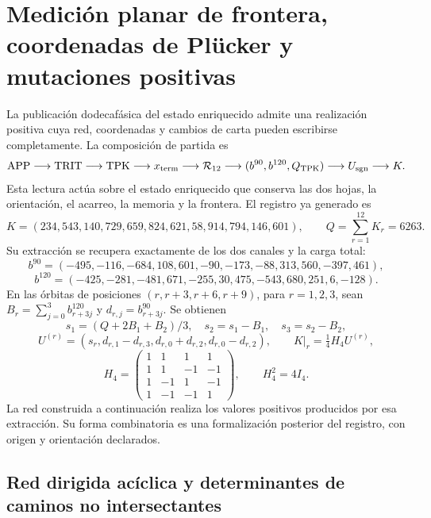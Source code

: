 \documentclass[a4paper,10pt]{article}
\theoremstyle{definition}\newtheorem{definition}[theorem]{Definición}
\theoremstyle{remark}\newtheorem{remark}[theorem]{Observación}
\numberwithin{equation}{section}
\begin{document}
\section{Medición planar de frontera, coordenadas de Plücker y mutaciones positivas}
\label{app:network-cluster}

La publicación dodecafásica del estado enriquecido admite una realización
positiva cuya red, coordenadas y cambios de carta pueden escribirse
completamente. La composición de partida es
\[
 \mathrm{APP}\longrightarrow\mathrm{TRIT}\longrightarrow\mathrm{TPK}
 \longrightarrow x_{\rm term}\longrightarrow\mathcal R_{12}
 \longrightarrow(b^{90},b^{120},Q_{\rm TPK})
 \longrightarrow U_{\rm sgn}\longrightarrow K.
\]
Esta lectura actúa sobre el estado enriquecido que conserva las dos hojas,
la orientación, el acarreo, la memoria y la frontera. El registro ya generado
es
\[
 K=(234,543,140,729,659,824,621,58,914,794,146,601),
 \qquad Q=\sum_{r=1}^{12}K_r=6263.
\]
Su extracción se recupera exactamente de los dos canales y la carga total:
\[
 b^{90}=(-495,-116,-684,108,601,-90,-173,-88,313,560,-397,461),
\]
\[
 b^{120}=(-425,-281,-481,671,-255,30,475,-543,680,251,6,-128).
\]
En las órbitas de posiciones \((r,r+3,r+6,r+9)\), para \(r=1,2,3\),
sean \(B_r=\sum_{j=0}^3b^{120}_{r+3j}\) y
\(d_{r,j}=b^{90}_{r+3j}\). Se obtienen
\[
 s_1=(Q+2B_1+B_2)/3,\quad s_2=s_1-B_1,\quad s_3=s_2-B_2,
\]
\[
 U^{(r)}=(s_r,d_{r,1}-d_{r,3},d_{r,0}+d_{r,2},d_{r,0}-d_{r,2}),
 \qquad K|_r=\tfrac14H_4U^{(r)},
\]
\[
 H_4=\begin{pmatrix}1&1&1&1\\1&1&-1&-1\\1&-1&1&-1\\1&-1&-1&1\end{pmatrix},
 \qquad H_4^2=4I_4.
\]
La red construida a continuación realiza los valores positivos producidos
por esa extracción. Su forma combinatoria es una formalización posterior
del registro, con origen y orientación declarados.

\subsection{Red dirigida acíclica y determinantes de caminos no intersectantes}
\end{document}
